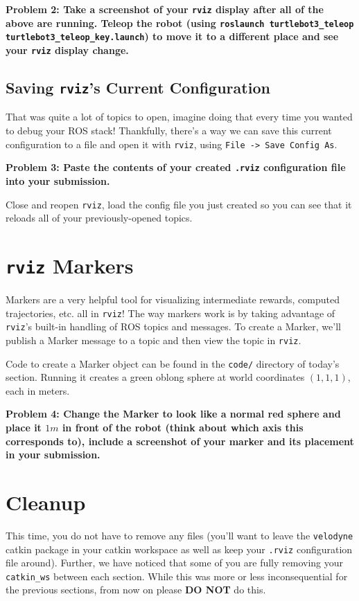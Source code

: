 \documentclass{article}
\begin{document}
{\bf Problem 2: Take a screenshot of your \texttt{rviz} display after all of the above are running. Teleop the robot (using \texttt{roslaunch turtlebot3\_teleop turtlebot3\_teleop\_key.launch}) to move it to a different place and see your \texttt{rviz} display change.}

\subsection{Saving \texttt{rviz}'s Current Configuration}

That was quite a lot of topics to open, imagine doing that every time you wanted to debug your ROS stack! Thankfully, there's a way we can save this current configuration to a file and open it with \texttt{rviz}, using \texttt{File -> Save Config As}. 

{\bf Problem 3: Paste the contents of your created \texttt{.rviz} configuration file into your submission.}

Close and reopen \texttt{rviz}, load the config file you just created so you can see that it reloads all of your previously-opened topics.

\section{\texttt{rviz} Markers}

Markers are a very helpful tool for visualizing intermediate rewards, computed trajectories, etc. all in \texttt{rviz}! The way markers work is by taking advantage of \texttt{rviz}'s built-in handling of ROS topics and messages. To create a Marker, we'll publish a Marker message to a topic and then view the topic in \texttt{rviz}.

Code to create a Marker object can be found in the \texttt{code/} directory of today's section. Running it creates a green oblong sphere at world coordinates $(1, 1, 1)$, each in meters.

{\bf Problem 4: Change the Marker to look like a normal red sphere and place it $1m$ in front of the robot (think about which axis this corresponds to), include a screenshot of your marker and its placement in your submission.}

\section{Cleanup}

This time, you do not have to remove any files (you'll want to leave the \texttt{velodyne} catkin package in your catkin workspace as well as keep your \texttt{.rviz} configuration file around). Further, we have noticed that some of you are fully removing your \texttt{catkin\_ws} between each section. While this was more or less inconsequential for the previous sections, from now on please \textbf{DO NOT} do this.
\end{document}
